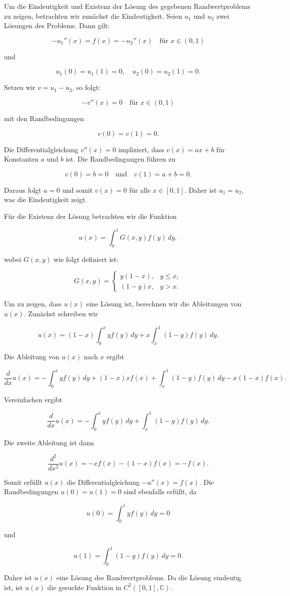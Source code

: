 Um die Eindeutigkeit und Existenz der Lösung des gegebenen Randwertproblems zu zeigen, betrachten wir zunächst die Eindeutigkeit. Seien \( u_1 \) und \( u_2 \) zwei Lösungen des Problems. Dann gilt:

\[
-u_1''(x) = f(x) = -u_2''(x) \quad \text{für } x \in (0,1)
\]

und

\[
u_1(0) = u_1(1) = 0, \quad u_2(0) = u_2(1) = 0.
\]

Setzen wir \( v = u_1 - u_2 \), so folgt:

\[
-v''(x) = 0 \quad \text{für } x \in (0,1)
\]

mit den Randbedingungen

\[
v(0) = v(1) = 0.
\]

Die Differentialgleichung \( v''(x) = 0 \) impliziert, dass \( v(x) = ax + b \) für Konstanten \( a \) und \( b \) ist. Die Randbedingungen führen zu

\[
v(0) = b = 0 \quad \text{und} \quad v(1) = a + b = 0.
\]

Daraus folgt \( a = 0 \) und somit \( v(x) = 0 \) für alle \( x \in [0,1] \). Daher ist \( u_1 = u_2 \), was die Eindeutigkeit zeigt.

Für die Existenz der Lösung betrachten wir die Funktion

\[
u(x) = \int_0^1 G(x, y) f(y) \, dy,
\]

wobei \( G(x, y) \) wie folgt definiert ist:

\[
G(x, y) = 
\begin{cases} 
y(1-x), & y \leq x, \\ 
(1-y)x, & y > x.
\end{cases}
\]

Um zu zeigen, dass \( u(x) \) eine Lösung ist, berechnen wir die Ableitungen von \( u(x) \). Zunächst schreiben wir

\[
u(x) = (1-x) \int_0^x y f(y) \, dy + x \int_x^1 (1-y) f(y) \, dy.
\]

Die Ableitung von \( u(x) \) nach \( x \) ergibt

\[
\frac{d}{dx} u(x) = -\int_0^x y f(y) \, dy + (1-x) x f(x) + \int_x^1 (1-y) f(y) \, dy - x(1-x) f(x).
\]

Vereinfachen ergibt

\[
\frac{d}{dx} u(x) = -\int_0^x y f(y) \, dy + \int_x^1 (1-y) f(y) \, dy.
\]

Die zweite Ableitung ist dann

\[
\frac{d^2}{dx^2} u(x) = -x f(x) - (1-x) f(x) = -f(x).
\]

Somit erfüllt \( u(x) \) die Differentialgleichung \( -u''(x) = f(x) \). Die Randbedingungen \( u(0) = u(1) = 0 \) sind ebenfalls erfüllt, da

\[
u(0) = \int_0^1 y f(y) \, dy = 0
\]

und

\[
u(1) = \int_0^1 (1-y) f(y) \, dy = 0.
\]

Daher ist \( u(x) \) eine Lösung des Randwertproblems. Da die Lösung eindeutig ist, ist \( u(x) \) die gesuchte Funktion in \( C^2([0,1], \mathbb{C}) \).